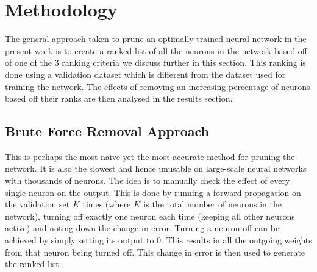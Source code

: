 \section{Methodology}
The general approach taken to prune an optimally trained neural network in the present work is to create a ranked list of all the neurons in the network based off of one of the 3 ranking criteria we discuss further in this section. This ranking is done using a validation dataset which is different from the dataset used for training the network. The effects of removing an increasing percentage of neurons based off their ranks are then analysed in the results section.

\subsection{Brute Force Removal Approach}
This is perhaps the most naive yet the most accurate method for pruning the network. It is also the slowest and hence unusable on large-scale neural networks with thousands of neurons. The idea is to manually check the effect of every single neuron on the output. This is done by running a forward propagation on the validation set $K$ times (where $K$ is the total number of neurons in the network), turning off exactly one neuron each time (keeping all other neurons active) and noting down the change in error. Turning a neuron off can be achieved by simply setting its output to 0. This results in all the outgoing weights from that neuron being turned off. This change in error is then used to generate the ranked list. 





